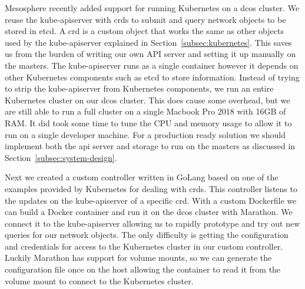 Mesosphere recently added support for running Kubernetes on a \gls{dcos} cluster. We reuse the kube-apiserver with \glspl{crd} to submit and query network objects to be stored in etcd. A \gls{crd} is a custom object that works the same as other objects used by the kube-apiserver explained in Section~\ref{subsec:kubernetes}. This saves us from the burden of writing our own API server and setting it up manually on the masters. The kube-apiserver runs as a single container however it depends on other Kubernetes components such as etcd to store information. Instead of trying to strip the kube-apiserver from Kubernetes components, we run an entire Kubernetes cluster on our \gls{dcos} cluster. This does cause some overhead, but we are still able to run a full cluster on a single Macbook Pro 2018 with 16GB of RAM. It did took some time to tune the CPU and memory usage to allow it to run on a single developer machine. For a production ready solution we should implement both the \gls{api} server and storage to run on the masters as discussed in Section~\ref{subsec:system-design}.

Next we created a custom controller written in GoLang\cite{golang} based on one of the examples provided by Kubernetes for dealing with \glspl{crd}. This controller listens to the updates on the kube-apiserver of a specific \gls{crd}. With a custom Dockerfile we can build a Docker container and run it on the \gls{dcos} cluster with Marathon. We connect it to the kube-apiserver allowing us to rapidly prototype and try out new queries for our network objects. The only difficulty is getting the configuration and credentials for access to the Kubernetes cluster in our custom controller. Luckily Marathon has support for volume mounts, so we can generate the configuration file once on the host allowing the container to read it from the volume mount to connect to the Kubernetes cluster.

